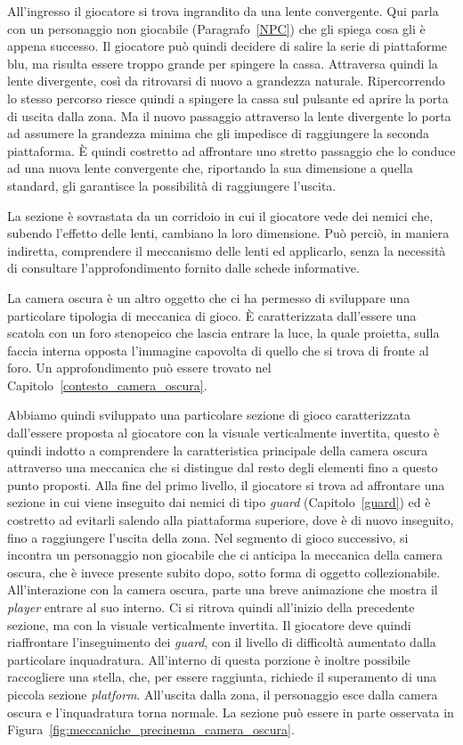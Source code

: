 All’ingresso il giocatore si trova ingrandito da una lente convergente. Qui parla con un personaggio non giocabile (Paragrafo~\ref{NPC}) che gli spiega cosa gli è appena successo. Il giocatore può quindi decidere di salire la serie di piattaforme blu, ma risulta essere troppo grande per spingere la cassa. Attraversa quindi la lente divergente, così da ritrovarsi di nuovo a grandezza naturale. Ripercorrendo lo stesso percorso riesce quindi a spingere la cassa sul pulsante ed aprire la porta di uscita dalla zona. Ma il nuovo passaggio attraverso la lente divergente lo porta ad assumere la grandezza minima che gli impedisce di raggiungere la seconda piattaforma. È quindi costretto ad affrontare uno stretto passaggio che lo conduce ad una nuova lente convergente che, riportando la sua dimensione a quella standard, gli garantisce la possibilità di raggiungere l’uscita.

La sezione è sovrastata da un corridoio in cui il giocatore vede dei nemici che, subendo l’effetto delle lenti, cambiano la loro dimensione. Può perciò, in maniera indiretta, comprendere il meccanismo delle lenti ed applicarlo, senza la necessità di consultare l’approfondimento fornito dalle schede informative.

La camera oscura è un altro oggetto che ci ha permesso di sviluppare una particolare tipologia di meccanica di gioco. È caratterizzata dall’essere una scatola con un foro stenopeico che lascia entrare la luce, la quale proietta, sulla faccia interna opposta l’immagine capovolta di quello che si trova di fronte al foro. Un approfondimento può essere trovato nel Capitolo~\ref{contesto_camera_oscura}.

Abbiamo quindi sviluppato una particolare sezione di gioco caratterizzata dall’essere proposta al giocatore con la visuale verticalmente invertita, questo è quindi indotto a comprendere la caratteristica principale della camera oscura attraverso una meccanica che si distingue dal resto degli elementi fino a questo punto proposti.
Alla fine del primo livello, il giocatore si trova ad affrontare una sezione in cui viene inseguito dai nemici di tipo \textit{guard} (Capitolo~\ref{guard}) ed è costretto ad evitarli salendo alla piattaforma superiore, dove è di nuovo inseguito, fino a raggiungere l’uscita della zona. Nel segmento di gioco successivo, si incontra un personaggio non giocabile che ci anticipa la meccanica della camera oscura, che è invece presente subito dopo, sotto forma di oggetto collezionabile.
All’interazione con la camera oscura, parte una breve animazione che mostra il \textit{player} entrare al suo interno. Ci si ritrova quindi all’inizio della precedente sezione, ma con la visuale verticalmente invertita. Il giocatore deve quindi riaffrontare l’inseguimento dei \textit{guard}, con il livello di difficoltà aumentato dalla particolare inquadratura. All’interno di questa porzione è inoltre possibile raccogliere una stella, che, per essere raggiunta, richiede il superamento di una piccola sezione \textit{platform}.
All’uscita dalla zona, il personaggio esce dalla camera oscura e l’inquadratura torna normale.
La sezione può essere in parte osservata in Figura~\ref{fig:meccaniche_precinema_camera_oscura}.

